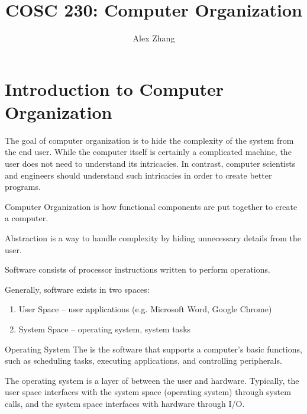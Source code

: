 \documentclass[12pt]{report}
\title{COSC 230: Computer Organization}
\author{Alex Zhang}
\begin{document}
\renewcommand{\arraystretch}{1.25}

\maketitle
\tableofcontents
\newpage

\chapter{Introduction to Computer Organization}
The goal of computer organization is to hide the complexity of the system from the end user. While the computer itself is certainly a complicated machine, the user does not need to understand its intricacies. In contrast, computer scientists and engineers should understand such intricacies in order to create better programs.
 
\begin{dfnbox}{Computer Organization}
	 is how functional components are put together to create a computer.
\end{dfnbox}

\begin{dfnbox}{Abstraction}
	 is a way to handle complexity by hiding unnecessary details from the user.
\end{dfnbox}

\begin{dfnbox}{Software}
	 consists of processor instructions written to perform operations.
\end{dfnbox}

Generally, software exists in two spaces:
\begin{enumerate}
	\item User Space -- user applications (e.g. Microsoft Word, Google Chrome)
	\item System Space -- operating system, system tasks
\end{enumerate}

\begin{dfnbox}{Operating System}
	The  is the software that supports a computer's basic functions, such as scheduling tasks, executing applications, and controlling peripherals.
\end{dfnbox}

The operating system is a layer of  between the user and hardware. Typically, the user space interfaces with the system space (operating system) through system calls, and the system space interfaces with hardware through I/O.
\end{document}
